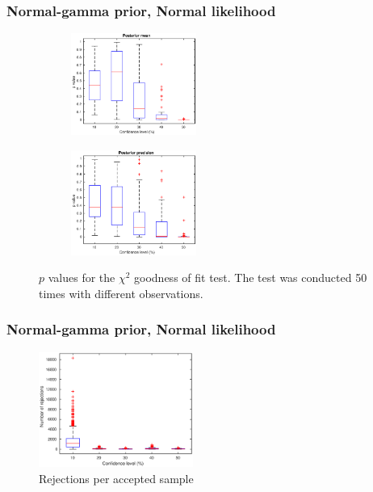 \documentclass{beamer}
\begin{document}
\begin{frame}
\frametitle{Normal-gamma prior, Normal likelihood}
\begin{figure}
\centering
\begin{subfigure}
\centering
\includegraphics[width=0.45\textwidth]{pvalue_mean.eps}
\end{subfigure}
\begin{subfigure}
\centering
\includegraphics[width=0.45\textwidth]{pvalue_precision.eps}
\end{subfigure}
\caption{$p$ values for the $\chi^2$ goodness of fit test. The test was conducted 50 times with different observations.}
\end{figure}
\end{frame}

\begin{frame}
\frametitle{Normal-gamma prior, Normal likelihood}
\begin{figure}
\centering
\includegraphics[width=0.45\textwidth]{rejections.eps}
\caption{Rejections per accepted sample}
\end{figure}
\end{frame}
\end{document}
